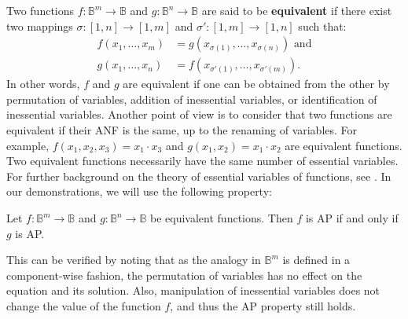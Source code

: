 Two functions $f\colon \mathbb{B}^m\to \mathbb{B}$ and $g\colon \mathbb{B}^n\to
\mathbb{B}$ are said to be {\bf equivalent} if there exist two mappings
$\sigma\colon
[1,n]\to [1,m]$ and $\sigma'\colon [1,m]\to [1,n]$ such that:
\begin{align*}
  f(x_1,\ldots , x_m)&=g(x_{\sigma(1)},\ldots,x_{\sigma(n)}) \text{ and} \\
   g(x_1,\ldots , x_n)&=f(x_{\sigma'(1)},\ldots,x_{\sigma'(m)}).
\end{align*}
In other words, $f$ and $g$ are equivalent if one can be obtained from the
other by permutation of variables, addition of inessential variables, or
identification of inessential variables. Another point of view is to consider
that two functions are equivalent if their ANF is the same, up to the
renaming of variables. For example, $f(x_1, x_2, x_3) = x_1
\cdot x_3$ and $g(x_1, x_2)  = x_1 \cdot x_2$ are equivalent functions.  Two
equivalent functions necessarily have the same number of essential
variables. For further background on the theory of essential variables of
functions, see \cite{CouceiroTCS08, CouceiroDM09, SalomaaAASF63, WillardDM96}.
In our demonstrations, we will use the following property:

\begin{property}\label{equivalent_functions}
Let $f\colon \mathbb{B}^m\to \mathbb{B}$ and $g\colon \mathbb{B}^n\to
  \mathbb{B}$ be equivalent functions. Then $f$ is AP if and only if $g$ is AP.
\end{property}

This can be verified by noting that as the analogy in $\mathbb{B}^m$ is defined
in a component-wise fashion, the permutation of variables has no effect on the equation and
its solution. Also, manipulation of inessential variables does not change the
value of the function $f$, and thus the AP property still holds.

